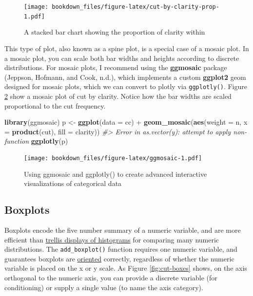 \documentclass[12pt,]{isuthesis}
\newenvironment{Shaded}{\begin{snugshade}}{\end{snugshade}}
\newcommand{\KeywordTok}[1]{\textcolor[rgb]{0.13,0.29,0.53}{\textbf{{#1}}}}
\newcommand{\DataTypeTok}[1]{\textcolor[rgb]{0.13,0.29,0.53}{{#1}}}
\newcommand{\StringTok}[1]{\textcolor[rgb]{0.31,0.60,0.02}{{#1}}}
\newcommand{\CommentTok}[1]{\textcolor[rgb]{0.56,0.35,0.01}{\textit{{#1}}}}
\newcommand{\NormalTok}[1]{{#1}}
\begin{document}
\begin{figure}[htbp]
\centering
\texttt{[image: bookdown\_files/figure-latex/cut-by-clarity-prop-1.pdf]}
\caption{\label{fig:cut-by-clarity-prop}A stacked bar chart showing the
proportion of clarity within}
\end{figure}

This type of plot, also known as a spine plot, is a special case of a
mosaic plot. In a mosaic plot, you can scale both bar widths and heights
according to discrete distributions. For mosaic plots, I recommend using
the \textbf{ggmosaic} package (Jeppson, Hofmann, and Cook, n.d.), which
implements a custom \textbf{ggplot2} geom designed for mosaic plots,
which we can convert to plotly via \texttt{ggplotly()}. Figure
\ref{fig:ggmosaic} show a mosaic plot of cut by clarity. Notice how the
bar widths are scaled proportional to the cut frequency.

\begin{Shaded}
\begin{Highlighting}[]
\KeywordTok{library}\NormalTok{(ggmosaic)}
\NormalTok{p <-}\StringTok{ }\KeywordTok{ggplot}\NormalTok{(}\DataTypeTok{data =} \NormalTok{cc) +}
\StringTok{  }\KeywordTok{geom_mosaic}\NormalTok{(}\KeywordTok{aes}\NormalTok{(}\DataTypeTok{weight =} \NormalTok{n, }\DataTypeTok{x =} \KeywordTok{product}\NormalTok{(cut), }\DataTypeTok{fill =} \NormalTok{clarity))}
\CommentTok{#> Error in as.vector(y): attempt to apply non-function}
\KeywordTok{ggplotly}\NormalTok{(p)}
\end{Highlighting}
\end{Shaded}

\begin{figure}[htbp]
\centering
\texttt{[image: bookdown\_files/figure-latex/ggmosaic-1.pdf]}
\caption{\label{fig:ggmosaic}Using ggmosaic and ggplotly() to create
advanced interactive visualizations of categorical data}
\end{figure}

\hypertarget{boxplots}{\subsection{Boxplots}\label{boxplots}}

Boxplots encode the five number summary of a numeric variable, and are
more efficient than \href{multiple-numeric-distributions}{trellis
displays of histograms} for comparing many numeric distributions. The
\texttt{add\_boxplot()} function requires one numeric variable, and
guarantees boxplots are
\href{https://plot.ly/r/reference/\#box-orientation}{oriented}
correctly, regardless of whether the numeric variable is placed on the x
or y scale. As Figure \ref{fig:cut-boxes} shows, on the axis orthogonal
to the numeric axis, you can provide a discrete variable (for
conditioning) or supply a single value (to name the axis category).
\end{document}
